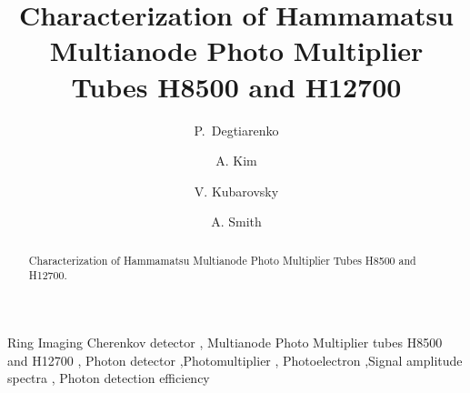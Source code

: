 \documentclass[5p,times,preprint]{elsarticle}
\begin{document}
\begin{frontmatter}
\title{Characterization of Hammamatsu Multianode Photo Multiplier Tubes H8500 and H12700}

\author[A]{P.~Degtiarenko }
\author[B]{A. Kim } 
\author[A]{V. Kubarovsky }

\author[C]{A. Smith}

\address[A]{Jefferson Lab, Newport News, Virginia, USA}
\address[B]{University of Connecticut, Storrs, CT 0626, USA}
\address[C]{Duke University, Durham, NC 2770, USA}



\begin{abstract}
Characterization of Hammamatsu Multianode Photo Multiplier Tubes H8500 and H12700.
\end{abstract}

\begin{keyword}
Ring Imaging Cherenkov detector \sep
Multianode Photo Multiplier tubes H8500 and H12700 \sep
Photon detector \sep Photomultiplier  \sep
Photoelectron  \sep  Signal amplitude spectra \sep 
Photon detection efficiency
\end{keyword}


\end{frontmatter}





















\end{document}
